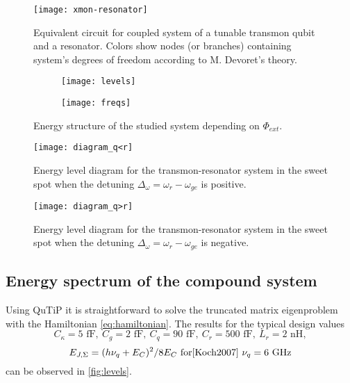 \documentclass[12pt, twoside]{report}
\numberwithin{equation}{section}
\begin{document}
\begin{figure}
\centering
\texttt{[image: xmon-resonator]}
\caption{Equivalent circuit for coupled system of a tunable transmon qubit and a resonator. Colors show nodes (or branches) containing system's degrees of freedom according to M. Devoret's theory\cite{Devoret1995}.}
\label{fig:xmon-resonator}
\end{figure}
\begin{figure}
\centering
\begin{subfigure}[t]{\textwidth}
\centering
\texttt{[image: levels]}
\end{subfigure}

\begin{subfigure}[t]{\textwidth}
\centering
\texttt{[image: freqs]}
\end{subfigure}
\caption{Energy structure of the studied system depending on $\Phi_{ext}$.}
\label{fig:levels}
\end{figure}


\begin{figure}[h]
\centering
\texttt{[image: diagram\_q<r]}
\caption{Energy level diagram for the transmon-resonator system in the sweet spot when the detuning $\Delta_\omega = \omega_r-\omega_{ge}$ is positive.}
\label{fig:diagram}
\end{figure}

\begin{figure}[h]
\centering
\texttt{[image: diagram\_q>r]}
\caption{Energy level diagram for the transmon-resonator system in the sweet spot when the detuning $\Delta_\omega = \omega_r-\omega_{ge}$ is negative.}
\label{fig:diagram2}
\end{figure}

\subsection{Energy spectrum of the compound system}

Using QuTiP\cite{Johansson2011} it is straightforward to solve the truncated matrix eigenproblem with the Hamiltonian \eqref{eq:hamiltonian}. The results for the typical design values
$$
C_\kappa = 5 \text{ fF},\ C_g = 2 \text{ fF},\ C_q = 90 \text{ fF},\ C_r = 500 \text{ fF},\ L_r = 2 \text{ nH}, $$
$$E_{J, \Sigma} = (h \nu_q + E_C)^2/8 E_C\ \text{for\cite{Koch2007}}\ \nu_q = 6\ \text{GHz}
$$
can be observed in \autoref{fig:levels}.
\end{document}
